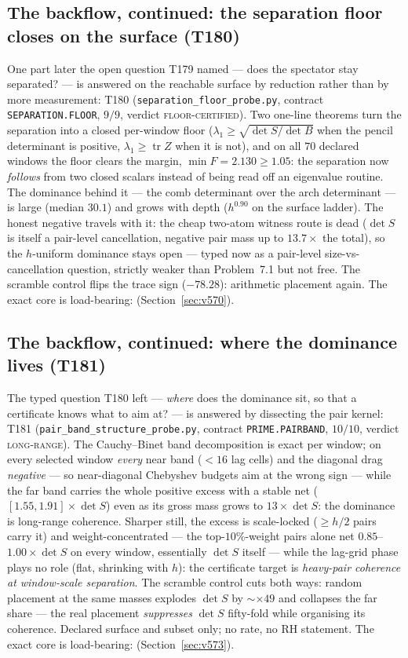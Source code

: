 \documentclass[11pt,a4paper]{article}
\begin{document}
\subsection{The backflow, continued: the separation floor closes on the surface (T180)}\label{sec:t180}
One part later the open question T179 named --- does the spectator stay
separated? --- is answered on the reachable surface by reduction rather than
by more measurement: T180 (\texttt{separation\_floor\_probe.py}, contract
\texttt{SEPARATION.FLOOR}, $9/9$, verdict \textsc{floor-certified}). Two
one-line theorems turn the separation into a closed per-window floor
($\lambda_1\ge\sqrt{\det S/\det B}$ when the pencil determinant is positive,
$\lambda_1\ge\operatorname{tr}Z$ when it is not), and on all $70$ declared
windows the floor clears the margin, $\min F=2.130\ge1.05$: the separation
now \emph{follows} from two closed scalars instead of being read off an
eigenvalue routine. The dominance behind it --- the comb determinant over
the arch determinant --- is large (median $30.1$) and grows with depth
($h^{0.90}$ on the surface ladder). The honest negative travels with it:
the cheap two-atom witness route is dead ($\det S$ is itself a pair-level
cancellation, negative pair mass up to $13.7\times$ the total), so the
$h$-uniform dominance stays open --- typed now as a pair-level
size-vs-cancellation question, strictly weaker than Problem~7.1 but not
free. The scramble control flips the trace sign ($-78.28$): arithmetic
placement again. The exact core is load-bearing:
 (Section~\ref{sec:v570}).

\subsection{The backflow, continued: where the dominance lives (T181)}\label{sec:t181}
The typed question T180 left --- \emph{where} does the dominance sit, so
that a certificate knows what to aim at? --- is answered by dissecting the
pair kernel: T181 (\texttt{pair\_band\_structure\_probe.py}, contract
\texttt{PRIME.PAIRBAND}, $10/10$, verdict \textsc{long-range}). The Cauchy--Binet band decomposition is exact per
window; on every selected window \emph{every} near band ($<16$ lag cells)
and the diagonal drag \emph{negative} --- so near-diagonal Chebyshev
budgets aim at the wrong sign --- while the far band carries the whole
positive excess with a stable net ($[1.55,1.91]\times\det S$) even as its
gross mass grows to $13\times\det S$: the dominance is long-range
coherence. Sharper still, the excess is scale-locked ($\ge h/2$ pairs
carry it) and weight-concentrated --- the top-$10\%$-weight pairs alone
net $0.85$--$1.00\times\det S$ on every window, essentially $\det S$
itself --- while the lag-grid phase plays no role (flat, shrinking with
$h$): the certificate target is \emph{heavy-pair coherence at
window-scale separation}. The scramble control cuts both ways: random
placement at the
same masses explodes $\det S$ by ${\sim}\times49$ and collapses the far
share --- the real placement \emph{suppresses} $\det S$ fifty-fold while
organising its coherence. Declared surface and subset only; no rate, no
RH statement. The exact core is load-bearing:
 (Section~\ref{sec:v573}).
\end{document}
